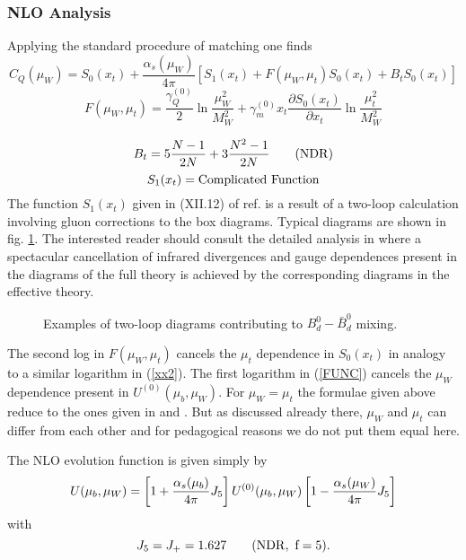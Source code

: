 \documentclass[12pt,rotate]{article}
\def\as{\alpha_s}
\newcommand{\be}{\begin{equation}}
\newcommand{\ee}{\end{equation}}
\begin{document}
\begin{itemize}
\begin{itemize}
\subsubsection{NLO Analysis}
Applying the standard procedure of matching one finds \cite{BJW90}
\be\label{NLOC}
C_Q(\mu_W)=S_0(x_t)+
\frac{\as(\mu_W)}{4\pi} \left[
S_1(x_t)+F(\mu_W,\mu_t)S_0(x_t)+B_t S_0(x_t)\right]
\ee
\be\label{FUNC}
F(\mu_W,\mu_t)=\frac{\gamma_Q^{(0)}}{2}
 \ln\frac{\mu^2_W}{M^2_W}+\gamma^{(0)}_{m} x_t
 \frac{\partial S_0(x_t)}{\partial x_t}\ln\frac{\mu^2_t}{M^2_W}
\ee

\begin{equation}\label{btndr}
B_t=5\frac{N-1}{2N}+3\frac{N^2-1}{2N}\qquad ({\rm NDR})
\end{equation}  
\be
S_1(x_t)= {\rm Complicated~Function}
\ee
The function $S_1(x_t)$ given in (XII.12) of ref. \cite{BBL}
is a result of a two-loop calculation \cite{BJW90} involving
gluon corrections to the box diagrams. Typical diagrams are shown in 
fig. \ref{L:8}.
The interested reader should consult the detailed analysis in \cite{BJW90}
where a spectacular cancellation of infrared divergences and gauge 
dependences present in the diagrams of the full theory is achieved by 
the corresponding diagrams in the effective theory.

\begin{figure}[hbt]
\vspace{0.10in}
\centerline{
\epsfysize=1.5in
}%
\vspace{0.08in}
\caption[]{Examples of two-loop diagrams contributing to 
$B_d^0-\bar B_d^0$ mixing.
\label{L:8}}
\end{figure}

The second log in $F(\mu_W,\mu_t)$ cancels the $\mu_t$
dependence in $S_0(x_t)$ in analogy to a similar logarithm in
(\ref{xx2}). The first logarithm in (\ref{FUNC}) cancels the
$\mu_W$ dependence present in $U^{(0)}(\mu_b,\mu_W)$.
For $\mu_W=\mu_t$ the formulae given above reduce to the ones given
in \cite{BJW90} and \cite{BBL}. But as discussed already there,
$\mu_W$ and $\mu_t$ can differ from each other and for
pedagogical reasons we do not put them equal here.

The NLO evolution function is given simply by
\begin{equation}\label{u02}
 U(\mu_b,\mu_W)=
\left[1+{\as(\mu_b)\over 4\pi} J_5 \right]  U^{(0)}(\mu_b,\mu_W) 
\left[1-{\as(\mu_W)\over 4\pi} J_5\right]
\end{equation}
with
\be
J_5=J_+=1.627
\qquad (\rm{NDR},~f=5).
\ee


\end{itemize}
\end{itemize}
\end{document}
